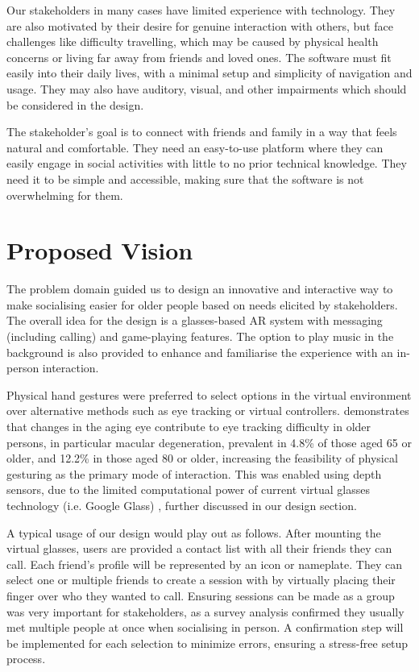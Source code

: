 \documentclass[12pt,a4paper]{article}
\begin{document}
Our stakeholders in many cases have limited experience with technology. They are also motivated by their desire for genuine interaction with others, but face challenges like difficulty travelling, which may be caused by physical health concerns or living far away from friends and loved ones. The software must fit easily into their daily lives, with a minimal setup and simplicity of navigation and usage. They may also have auditory, visual, and other impairments which should be considered in the design. 


The stakeholder's goal is to connect with friends and family in a way that feels natural and comfortable. They need an easy-to-use platform where they can easily engage in social activities with little to no prior technical knowledge. They need it to be simple and accessible, making sure that the software is not overwhelming for them. 


\section{Proposed Vision}

The problem domain guided us to design an innovative and interactive way to make socialising easier for older people based on needs elicited by stakeholders. The overall idea for the design is a glasses-based AR system with messaging (including calling) and game-playing features. The option to play music in the background is also provided to enhance and familiarise the experience with an in-person interaction. 

Physical hand gestures were preferred to select options in the virtual environment over alternative methods such as eye tracking or virtual controllers. \cite{Davis_2021} demonstrates that changes in the aging eye contribute to eye tracking difficulty in older persons, in particular macular degeneration, prevalent in 4.8\% of those aged 65 or older, and 12.2\% in those aged 80 or older, increasing the feasibility of physical gesturing as the primary mode of interaction. This was enabled using depth sensors, due to the limited computational power of current virtual glasses technology (i.e. Google Glass) \cite{Bikos_2015}, further discussed in our design section. 

A typical usage of our design would play out as follows. After mounting the virtual glasses, users are provided a contact list with all their friends they can call. Each friend’s profile will be represented by an icon or nameplate. They can select one or multiple friends to create a session with by virtually placing their finger over who they wanted to call. Ensuring sessions can be made as a group was very important for stakeholders, as a survey analysis confirmed they usually met multiple people at once when socialising in person. A confirmation step will be implemented for each selection to minimize errors, ensuring a stress-free setup process. 
\end{document}
